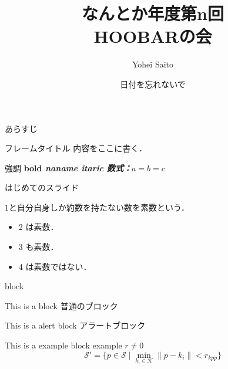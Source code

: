 \documentclass[dvipdfmx, a4p, cjk]{beamer}
\title{なんとか年度第n回 \\ HOOBARの会}
\author{Yohei Saito}
\institute[なんとか研究室]{信州大学 理工学科 なんとかかんとか研究室}
\date{日付を忘れないで}
\begin{document}
\frame{\titlepage \thispagestyle{empty}}
\begin{frame}{あらすじ} \tableofcontents \end{frame}
\begin{frame}{フレームタイトル}
内容をここに書く．

\alert{強調}
\bf{bold}
\sl{naname}
\it{itaric}
数式：$a=b=c$

\end{frame}

\begin{frame}{はじめてのスライド}
    \begin{definition}
    1と自分自身しか約数を持たない数を\alert{素数}という．
    \end{definition}
    \begin{example}
        \begin{itemize}
        \item 2 は素数．
        \item 3 も素数．
        \item 4 は素数ではない．
        \end{itemize}
    \end{example}
\end{frame}

\begin{frame}{block}
    \begin{block}{This is a block}
        普通のブロック
    \end{block}
    \begin{alertblock}{This is a alert block}
        アラートブロック
    \end{alertblock}
    \begin{exampleblock}{This is a example block}
        example
        $r \neq 0$
        \[ \mathcal{S}' = \{ p \in \mathcal{S} \mid \min_{k_i \in \mathcal{K}} \|p - k_i\| < r_{kpp} \} \]
    \end{exampleblock}
\end{frame}
\end{document}
